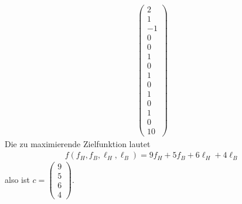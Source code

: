 \begin{enumerate}[1.]
\begin{enumerate}[1.]
\begin{align*}
\begin{pmatrix}
            2\\
            1\\
            -1\\
            0\\
            0\\
            1\\
            0\\
            1\\
            0\\
            1\\
            0\\
            1\\
            0\\
            10
          \end{pmatrix}
        \end{align*}
        Die zu maximierende Zielfunktion lautet
        \begin{align*}
          f(f_H, f_B, \ell_H, \ell_B) = 9 f_H + 5 f_B + 6 \ell_H + 4 \ell_B
        \end{align*}
        also ist $c = \begin{pmatrix}
          9\\
          5\\
          6\\
          4
        \end{pmatrix}$.

      \pagebreak


\end{enumerate}
\end{enumerate}
